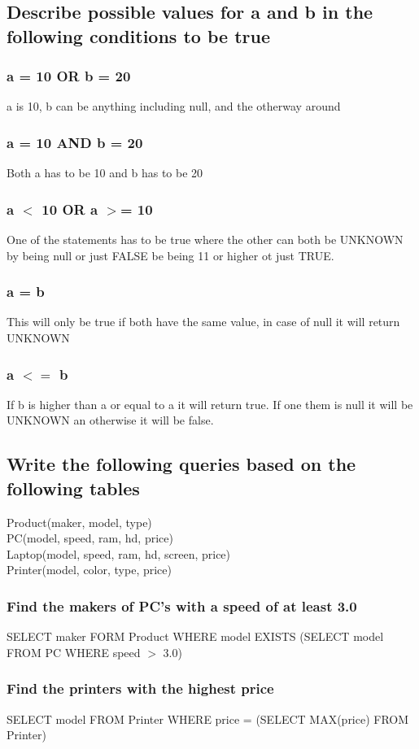\documentclass[12pt, a4paper]{article}
\begin{document}
		\subsection{Describe possible values for a and b in the following conditions to be true}
			\subsubsection{a = 10 OR b = 20}
				a is 10, b can be anything including null, and the otherway around
			\subsubsection{a = 10 AND b = 20}
				Both a has to be 10 and b has to be 20
			\subsubsection{a $<$ 10 OR a $>$= 10}
				One of the statements has to be true where the other can both be UNKNOWN by being null or just FALSE be being 11 or higher ot just TRUE.
			\subsubsection{a = b}
				This will only be true if both have the same value, in case of null it will return UNKNOWN
			\subsubsection{a $<=$ b}
				If b is higher than a or equal to a it will return true. If one them is null it will be UNKNOWN an otherwise it will be false.
		\subsection{Write the following queries based on the following tables}
			Product(maker, model, type)\\
			PC(model, speed, ram, hd, price)\\
			Laptop(model, speed, ram, hd, screen, price)\\
			Printer(model, color, type, price)\\
			\subsubsection{Find the makers of PC's with a speed of at least 3.0}
				SELECT maker FORM Product WHERE model EXISTS (SELECT model FROM PC WHERE speed $>$ 3.0)
			\subsubsection{Find the printers with the highest price}
				SELECT model FROM Printer WHERE price = (SELECT MAX(price) FROM Printer)
\end{document}
